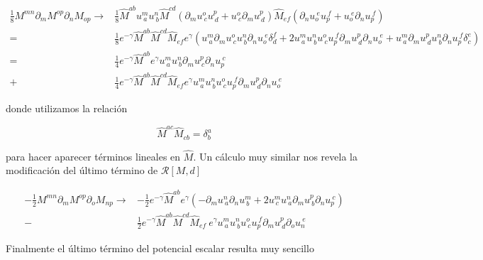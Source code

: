 \documentclass{article}
\numberwithin{equation}{section}
\begin{document}
\begin{equation}\label{V5}
\begin{aligned}
\frac{1}{8} M^{m n} \partial_m M^{o p} \partial_n M_{o p} \longrightarrow& \frac{1}{8} \hat{M}^{a b} u^{m}_{\ a} u^{n}_{\ b} \hat{M}^{c d} \left( \partial_m u^{o}_{\ c} u^{p}_{ \ d} + u^{o}_{\ c} \partial_m u^{p}_{ \ d} \right) \hat{M}_{e f} \left( \partial_n u_{o}^{\ e} u_{p}^{ \ f} + u_{o}^{\ e} \partial_n u_{p}^{ \ f} \right)\\
=&\frac{1}{8} e^{-\gamma} \hat{M}^{a b} \hat{M}^{c d}\hat{M}_{e f} e^{\gamma} \left( u^{m}_{\ a} \partial_m u^{o}_{\ c} u^{n}_{\ b} \partial_n u_{o}^{\ e} \delta^f_d + 2 u^{m}_{\ a} u^{n}_{\ b} u^{o}_{\ c} u_{p}^{\ f} \partial_m u^{p}_{\ d} \partial_n u_{o}^{\ e} + u^{m}_{\ a} \partial_m u^{p}_{\ d} u^{n}_{\ b} \partial_n u_{p}^{\ f} \delta^e_c\right)\\
=& \frac{1}{4} e^{-\gamma} \hat{M}^{a b}  e^{\gamma} u^{m}_{\ a} u^{n}_{\ b} \partial_m u^{p}_{\ c}  \partial_n u_{p}^{\ c}\\
+& \frac{1}{4} e^{-\gamma} \hat{M}^{a b} \hat{M}^{c d}\hat{M}_{e f} e^{\gamma} u^{m}_{\ a} u^{n}_{\ b} u^{o}_{\ c} u_{p}^{\ f} \partial_m u^{p}_{\ d} \partial_n u_{o}^{\ e} 
\end{aligned}
\end{equation}

donde utilizamos la relación

\begin{equation}
\hat{M}^{a c} \hat{M}_{c b} = \delta^a_b
\end{equation}

para hacer aparecer términos lineales en $ \hat{M} $. Un cálculo muy similar nos revela la modificación del último término de $ \mathcal{R}[M,d] $

\begin{equation}\label{V6}
\begin{aligned}
- \frac{1}{2} M^{m n} \partial_m M^{o p} \partial_o M_{n p} \longrightarrow& - \frac{1}{2} e^{-\gamma} \hat{M}^{a b}  e^{\gamma} \left( -\partial_m u^{n}_{\ a} \partial_n u^{m}_{\ b} + 2 u^{m}_{\ c} u^{n}_{\ a} \partial_m u^{p}_{\ b} \partial_n u_{p}^{\ c}\right)\\
-& \frac{1}{2} e^{-\gamma} \hat{M}^{a b} \hat{M}^{c d}\hat{M}_{e f} \ e^{\gamma}  u^{m}_{\ a} u^{n}_{\ b} u^{o}_{\ c} u_{p}^{\ f} \partial_m u^{p}_{\ d} \partial_o u_{n}^{\ e} 
\end{aligned}
\end{equation}

Finalmente el último término del potencial escalar resulta muy sencillo
\end{document}
